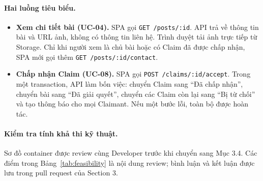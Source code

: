 \paragraph{Hai luồng tiêu biểu.}
\begin{itemize}
  \item \textbf{Xem chi tiết bài (UC-04).} SPA gọi \texttt{GET /posts/:id}. API trả về thông tin bài và URL ảnh, không có thông tin liên hệ. Trình duyệt tải ảnh trực tiếp từ Storage. Chỉ khi người xem là chủ bài hoặc có Claim đã được chấp nhận, SPA mới gọi thêm \texttt{GET /posts/:id/contact}.
  \item \textbf{Chấp nhận Claim (UC-08).} SPA gọi \texttt{POST /claims/:id/accept}. Trong một transaction, API làm bốn việc: chuyển Claim sang ``Đã chấp nhận'', chuyển bài sang ``Đã giải quyết'', chuyển các Claim còn lại sang ``Bị từ chối'' và tạo thông báo cho mọi Claimant. Nếu một bước lỗi, toàn bộ được hoàn tác.
\end{itemize}

\paragraph{Kiểm tra tính khả thi kỹ thuật.} Sơ đồ container được review cùng Developer trước khi chuyển sang Mục 3.4. Các điểm trong Bảng~\ref{tab:feasibility} là nội dung review; bình luận và kết luận được lưu trong pull request của Section 3.

